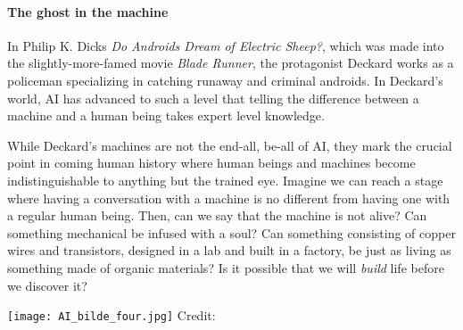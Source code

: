 
\paragraph{The ghost in the machine}

In Philip K. Dicks \emph{Do Androids Dream of Electric Sheep?}, which was made into the slightly-more-famed movie \emph{Blade Runner}, the protagonist Deckard works as a policeman specializing in catching runaway and criminal androids. In Deckard's world, AI has advanced to such a level that telling the difference between a machine and a human being takes expert level knowledge.

While Deckard's machines are not the end-all, be-all of AI, they mark the crucial point in coming human history where human beings and machines become indistinguishable to anything but the trained eye.
Imagine we can reach a stage where having a conversation with a machine is no different from having one with a regular human being.
Then, can we say that the machine is not alive?
Can something mechanical be infused with a soul?
Can something consisting of copper wires and transistors, designed in a lab and built in a factory, be just as living as something made of organic materials?
Is it possible that we will \emph{build} life before we discover it?

\begin{center}
	\texttt{[image: AI\_bilde\_four.jpg]}
	\tiny{Credit: }
\end{center}

